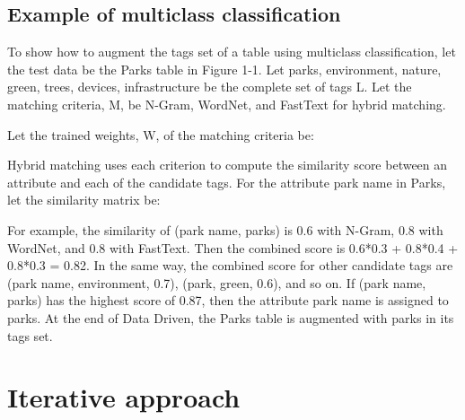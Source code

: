 \subsection{Example of multiclass classification}

To show how to augment the tags set of a table using multiclass classification, let the test data be the Parks table in Figure 1-1. Let {parks, environment, nature, green, trees, devices, infrastructure} be the complete set of tags L. Let the matching criteria, M, be {N-Gram, WordNet, and FastText} for hybrid matching.

Let the trained weights, W, of the matching criteria be:

Hybrid matching uses each criterion to compute the similarity score between an attribute and each of the candidate tags. For the attribute park name in Parks, let the similarity matrix be:

For example, the similarity of (park name, parks) is 0.6 with N-Gram, 0.8 with WordNet, and 0.8 with FastText. Then the combined score is 0.6*0.3 + 0.8*0.4 + 0.8*0.3 = 0.82. In the same way, the combined score for other candidate tags are (park name, environment, 0.7), (park, green, 0.6), and so on. If (park name, parks) has the highest score of 0.87, then the attribute park name is assigned to parks. At the end of Data Driven, the Parks table is augmented with parks in its tags set.

\section{Iterative approach}
\label{sec:IterativeApproach}

